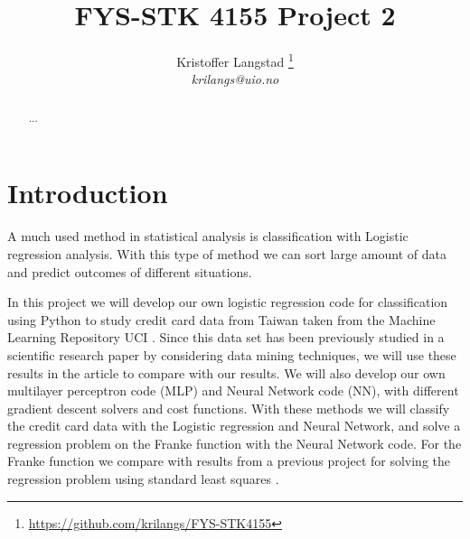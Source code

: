 \documentclass[12pt,a4paper,english]{article}
\title{FYS-STK 4155 Project 2}
\date{}
\author{ Kristoffer Langstad \footnote{\url{https://github.com/krilangs/FYS-STK4155}}\\ \textit{krilangs@uio.no}}
\begin{document}
\maketitle
\begin{abstract}
	...
\end{abstract}
\section{Introduction}
A much used method in statistical analysis is classification with Logistic regression analysis. With this type of method we can sort large amount of data and predict outcomes of different situations. 

In this project we will develop our own logistic regression code for classification using Python to study credit card data from Taiwan taken from the Machine Learning Repository UCI \cite{UCI}. Since this data set has been previously studied in a scientific research paper by \citet{origarticle} considering data mining techniques, we will use these results in the article to compare with our results. We will also develop our own multilayer perceptron code (MLP) and Neural Network code (NN), with different gradient descent solvers and cost functions. With these methods we will classify the credit card data with the Logistic regression and Neural Network, and solve a regression problem on the Franke function with the Neural Network code. For the Franke function we compare with results from a previous project for solving the regression problem using standard least squares \cite{proj1}.
\end{document}
